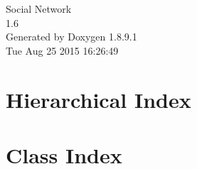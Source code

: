 \documentclass[twoside]{book}
\newcommand{\+}{\discretionary{\mbox{\scriptsize$\hookleftarrow$}}{}{}}
\newcommand{\clearemptydoublepage}{%
  \newpage{\pagestyle{empty}\cleardoublepage}%
}
\begin{document}
\hypersetup{pageanchor=false,
             bookmarks=true,
             bookmarksnumbered=true,
             pdfencoding=unicode
            }
\begin{titlepage}
\vspace*{7cm}
\begin{center}%
{\Large Social Network \\[1ex]\large 1.\+6 }\\
\vspace*{1cm}
{\large Generated by Doxygen 1.8.9.1}\\
\vspace*{0.5cm}
{\small Tue Aug 25 2015 16:26:49}\\
\end{center}
\end{titlepage}
\clearemptydoublepage
\tableofcontents
\clearemptydoublepage
{}
\hypersetup{pageanchor=true}

\chapter{Hierarchical Index}

\chapter{Class Index}

\end{document}
